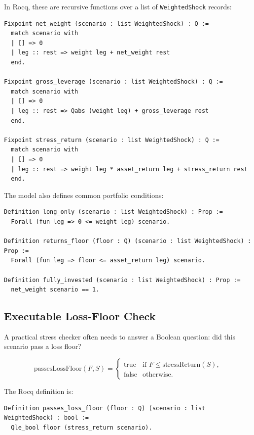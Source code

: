 \documentclass[11pt]{article}
\begin{document}
In Rocq, these are recursive functions over a list of \texttt{WeightedShock}
records:

\begin{lstlisting}[language=Coq]
Fixpoint net_weight (scenario : list WeightedShock) : Q :=
  match scenario with
  | [] => 0
  | leg :: rest => weight leg + net_weight rest
  end.

Fixpoint gross_leverage (scenario : list WeightedShock) : Q :=
  match scenario with
  | [] => 0
  | leg :: rest => Qabs (weight leg) + gross_leverage rest
  end.

Fixpoint stress_return (scenario : list WeightedShock) : Q :=
  match scenario with
  | [] => 0
  | leg :: rest => weight leg * asset_return leg + stress_return rest
  end.
\end{lstlisting}

The model also defines common portfolio conditions:

\begin{lstlisting}[language=Coq]
Definition long_only (scenario : list WeightedShock) : Prop :=
  Forall (fun leg => 0 <= weight leg) scenario.

Definition returns_floor (floor : Q) (scenario : list WeightedShock) : Prop :=
  Forall (fun leg => floor <= asset_return leg) scenario.

Definition fully_invested (scenario : list WeightedShock) : Prop :=
  net_weight scenario == 1.
\end{lstlisting}

\subsection{Executable Loss-Floor Check}

A practical stress checker often needs to answer a Boolean question: did this
scenario pass a loss floor?

\[
  \mathrm{passesLossFloor}(F, S) =
  \begin{cases}
  \mathrm{true} & \text{if } F \leq \mathrm{stressReturn}(S),\\
  \mathrm{false} & \text{otherwise.}
  \end{cases}
\]

The Rocq definition is:

\begin{lstlisting}[language=Coq]
Definition passes_loss_floor (floor : Q) (scenario : list WeightedShock) : bool :=
  Qle_bool floor (stress_return scenario).
\end{lstlisting}
\end{document}
